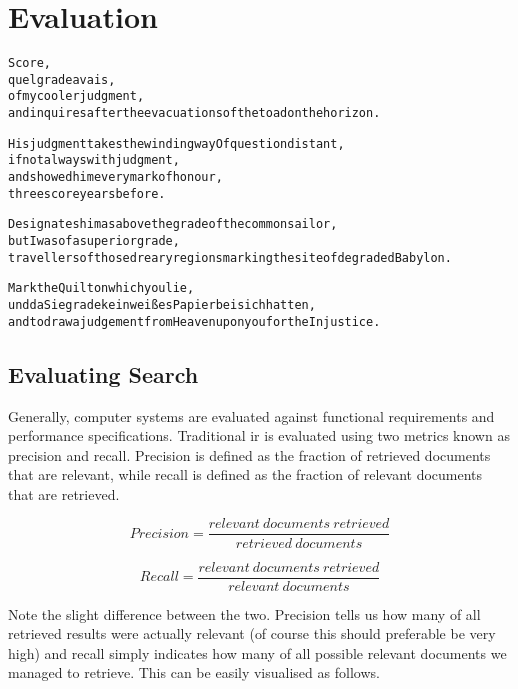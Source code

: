 
\chapter{Evaluation}
\label{ch:evaluation}

\startcontents[chapters]

\vfill

\begin{alltt}\sffamily
Score,
quel grade avais,
of my cooler judgment,
and inquires after the evacuations of the toad on the horizon.

His judgment takes the winding way Of question distant,
if not always with judgment,
and showed him every mark of honour,
three score years before.

Designates him as above the grade of the common sailor,
but I was of a superior grade,
travellers of those dreary regions marking the site of degraded Babylon.

Mark the Quilt on which you lie,
und da Sie grade kein weißes Papier bei sich hatten,
and to draw a judgement from Heaven upon you for the Injustice.
\end{alltt}

\newpage
\minicontents
\spirals

\section{Evaluating Search}
\label{s:evalsearch}

Generally, computer systems are evaluated against functional requirements and performance specifications. Traditional \gls{ir} is evaluated using two metrics known as precision and recall. Precision is defined as the fraction of retrieved documents that are relevant, while recall is defined as the fraction of relevant documents that are retrieved.

\begin{equation}
  Precision = \frac{relevant \ documents \ retrieved}{retrieved \ documents}
  \label{eq:precision}
\end{equation}

\begin{equation}
  Recall = \frac{relevant \ documents \ retrieved}{relevant \ documents}
\label{eq:recall}
\end{equation}

Note the slight difference between the two. Precision tells us how many of all retrieved results were actually relevant (of course this should preferable be very high) and recall simply indicates how many of all possible relevant documents we managed to retrieve. This can be easily visualised as follows.

